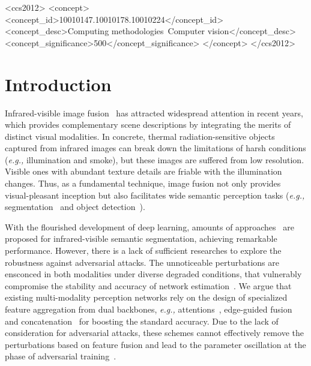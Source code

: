 \documentclass[sigconf]{acmart}
\begin{document}
\begin{CCSXML}
	<ccs2012>
	<concept>
	<concept_id>10010147.10010178.10010224</concept_id>
	<concept_desc>Computing methodologies~Computer vision</concept_desc>
	<concept_significance>500</concept_significance>
	</concept>
	</ccs2012>
\end{CCSXML}






\maketitle

\section{Introduction}

Infrared-visible image fusion~\cite{U2Fusion2020,UMFusion,zhang2021sdnet,jiang2022towards} has attracted widespread attention in recent years, which provides complementary scene descriptions by integrating the merits of distinct visual modalities. In concrete,
thermal radiation-sensitive objects captured from infrared images can break down the limitations of harsh conditions (\textit{e.g.,} illumination and smoke), but these images are suffered from low resolution. Visible ones with abundant texture details are friable with the 
illumination changes. Thus, as a fundamental technique, image fusion not only provides visual-pleasant inception but also facilitates wide semantic perception tasks (\textit{e.g.,} segmentation~\cite{SeaFusion,liu2022learning} and object detection~\cite{TarDAL,ma2022pia,sun2022drone}).



With the flourished development of deep learning, amounts of  approaches~\cite{sun2019rtfnet,ha2017mfnet,TarDAL,SeaFusion,liu2023bilevel} are proposed for infrared-visible semantic segmentation, achieving remarkable performance.
However, there is a lack of sufficient researches to explore the robustness against adversarial attacks. The unnoticeable perturbations are ensconced in both modalities under diverse degraded conditions, that vulnerably compromise the stability and accuracy of network estimation~\cite{dong2019evading,su2018robustness}. We argue that existing multi-modality perception networks rely on the design of specialized feature aggregation  from dual backbones, \textit{e.g.,} attentions~\cite{lasnet}, edge-guided fusion~\cite{zhou2021gmnet} and concatenation~\cite{ha2017mfnet} for boosting the standard accuracy. Due to the lack of consideration for adversarial attacks,  these schemes cannot effectively remove the perturbations based on feature fusion and lead to the parameter oscillation at the phase of adversarial training~\cite{gu2022segpgd}.
\end{document}
